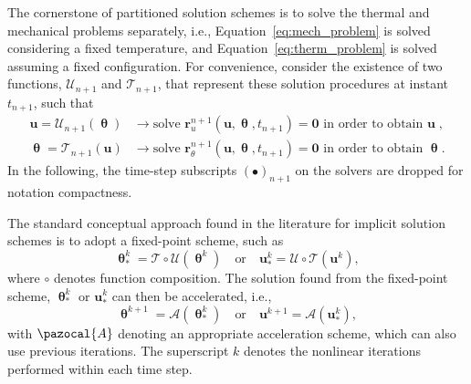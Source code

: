 The cornerstone of partitioned solution schemes is to solve the thermal and mechanical problems separately, i.e., Equation~\eqref{eq:mech_problem} is solved considering a fixed temperature, and Equation~\eqref{eq:therm_problem} is solved assuming a fixed configuration.
For convenience, consider the existence of two functions, \(\bm{\mathcal{U}}_{n+1}\) and \(\bm{\mathcal{T}}_{n+1}\), that represent these solution procedures at instant \(t_{n+1}\), such that
\begin{align}
  \mathbf{u} = \bm{\mathcal{U}}_{n+1}(\bm{\uptheta}) & \rightarrow \text{solve } \mathbf{r}_{u}^{n+1}(\mathbf{u}, \bm{\uptheta}, t_{n+1})=\bm{0} \text{ in order to obtain } \mathbf{u}\;, \label{eq:def_solvers_u} \\
  \bm{\uptheta} = \bm{\mathcal{T}}_{n+1}(\mathbf{u}) & \rightarrow \text{solve } \mathbf{r}_{\theta}^{n+1}(\mathbf{u}, \bm{\uptheta}, t_{n+1})=\bm{0} \text{ in order to obtain } \bm{\uptheta}. \label{eq:def_solvers_t}
\end{align}
In the following, the time-step subscripts $(\bullet)_{n+1}$ on the solvers are dropped for notation compactness.

The standard conceptual approach found in the literature for implicit solution schemes is to adopt a fixed-point scheme, such as
\begin{equation}
  \bm{\uptheta}^{k}_* = \bm{\mathcal{T}} \circ \bm{\mathcal{U}}(\bm{\uptheta}^k) \quad \text{or} \quad \mathbf{u}^{k}_* = \bm{\mathcal{U}} \circ \bm{\mathcal{T}}(\mathbf{u}^k),
\end{equation}
where \(\circ\) denotes function composition.
The solution found from the fixed-point scheme, \(\bm{\uptheta}^{k}_*\) or \(\mathbf{u}^{k}_*\) can then be accelerated, i.e.,
\begin{equation}
  \bm{\uptheta}^{k+1} = \bm{\mathcal{A}}(\bm{\uptheta}^{k}_*) \quad \text{or} \quad \mathbf{u}^{k+1} = \bm{\mathcal{A}}(\mathbf{u}^{k}_*),
\end{equation}
with \(\pazocal{A}\) denoting an appropriate acceleration scheme, which can also use previous iterations.
The superscript \(k\) denotes the nonlinear iterations performed within each time step.

